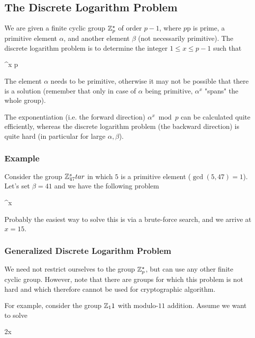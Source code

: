 
\subsection{The Discrete Logarithm Problem}

We are given a finite cyclic group $\mathbb{Z}_p^\star$ of order $p-1$, where $p$p is prime, a primitive element $\alpha$, and another element $\beta$ (not necessarily primitive). The discrete logarithm problem is to determine the integer $1 \leq x \leq p-1$ such that

\bee
\alpha^x \equiv \beta \bmod p
\eee

The element $\alpha$ needs to be primitive, otherwise it may not be possible that there is a solution (remember that only in case of $\alpha$ being primitive, $\alpha^x$ "spans" the whole group).

The exponentiation (i.e. the forward direction) $\alpha^x \bmod p$ can be calculated quite efficiently, whereas the discrete logarithm problem (the backward direction) is quite hard (in particular for large $\alpha, \beta$).

\subsubsection{Example}

Consider the group $\mathbb{Z}_{47}^star$ in which $5$ is a primitive element ($\gcd(5,47) = 1$). Let's set $\beta = 41$ and we have the following problem

^x  
\eee

Probably the easiest way to solve this is via a brute-force search, and we arrive at $x = 15$.

\subsubsection{Generalized Discrete Logarithm Problem}

We need not restrict ourselves to the group $\mathbb{Z}_p^\star$, but can use any other finite cyclic group. However, note that there are groups for which this problem is not hard and which therefore cannot be used for cryptographic algorithm.

For example, consider the group $\mathbb{Z}_11$ with modulo-$11$ addition. Assume we want to solve

\bee
2x  
\eee

